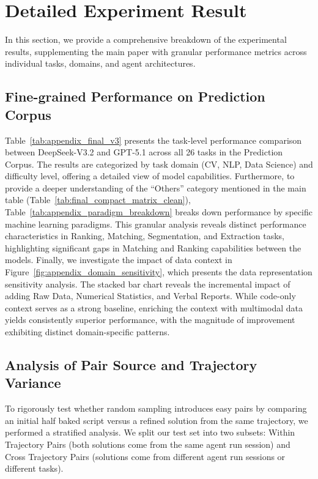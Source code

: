 \section{Detailed Experiment Result}
\label{appendix:detailed_exp_result}

In this section, we provide a comprehensive breakdown of the experimental results, supplementing the main paper with granular performance metrics across individual tasks, domains, and agent architectures.

\subsection{Fine-grained Performance on Prediction Corpus}
\label{app:fine_grained_performance}
Table~\ref{tab:appendix_final_v3} presents the task-level performance comparison between DeepSeek-V3.2 and GPT-5.1 across all 26 tasks in the Prediction Corpus.
The results are categorized by task domain (CV, NLP, Data Science) and difficulty level, offering a detailed view of model capabilities.
Furthermore, to provide a deeper understanding of the ``Others'' category mentioned in the main table (Table~\ref{tab:final_compact_matrix_clean}), Table~\ref{tab:appendix_paradigm_breakdown} breaks down performance by specific machine learning paradigms.
This granular analysis reveals distinct performance characteristics in Ranking, Matching, Segmentation, and Extraction tasks, highlighting significant gaps in Matching and Ranking capabilities between the models.
Finally, we investigate the impact of data context in Figure~\ref{fig:appendix_domain_sensitivity}, which presents the data representation sensitivity analysis.
The stacked bar chart reveals the incremental impact of adding Raw Data, Numerical Statistics, and Verbal Reports.
While code-only context serves as a strong baseline, enriching the context with multimodal data yields consistently superior performance, with the magnitude of improvement exhibiting distinct domain-specific patterns.


\subsection{Analysis of Pair Source and Trajectory Variance}
\label{app:trajectory_variance}

To rigorously test whether random sampling introduces easy pairs by comparing an initial half baked script versus a refined solution from the same trajectory, we performed a stratified analysis.
We split our test set into two subsets: Within Trajectory Pairs (both solutions come from the same agent run session) and Cross Trajectory Pairs (solutions come from different agent run sessions or different tasks).

